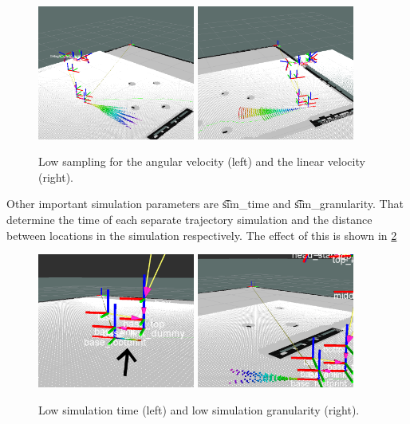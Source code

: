 \begin{figure}
	\centering
	\includegraphics[width=0.46\textwidth]{./img/5samplingtheta}
	\includegraphics[width=0.46\textwidth]{./img/xsampling}
	\caption{Low sampling for the angular velocity (left) and the linear velocity (right).}
	\label{fig:5:sampling}
\end{figure}

Other important simulation parameters are \t{sim_time} and \t{sim_granularity}. That determine the time of each separate trajectory simulation and the distance between locations in the simulation respectively. The effect of this is shown in \cref{fig:5:sim}

\begin{figure}
	\centering
	\includegraphics[width=0.46\textwidth]{./img/1simtime}
	\includegraphics[width=0.46\textwidth]{./img/09granularity}
	\caption{Low simulation time (left) and low simulation granularity (right).}
	\label{fig:5:sim}
\end{figure}

